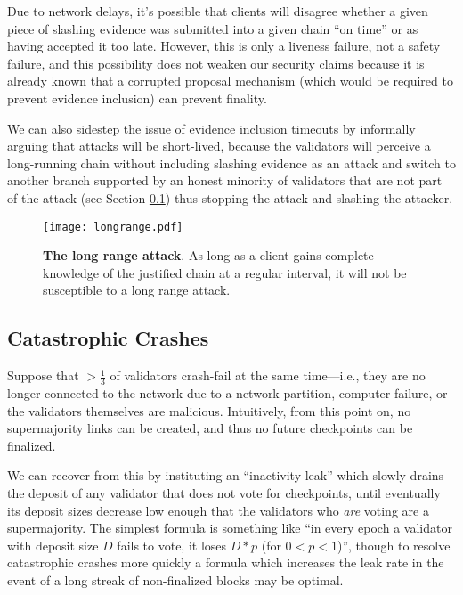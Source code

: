 \documentclass[12pt]{article}
\begin{document}
Due to network delays, it's possible that clients will disagree whether a given piece of slashing evidence was submitted into a given chain ``on time'' or as having accepted it too late. However, this is only a liveness failure, not a safety failure, and this possibility does not weaken our security claims because it is already known that a corrupted proposal mechanism (which would be required to prevent evidence inclusion) can prevent finality.

We can also sidestep the issue of evidence inclusion timeouts by informally arguing that attacks  will be short-lived, because the validators will perceive a long-running chain without including slashing evidence as an attack and switch to another branch supported by an honest minority of validators that are not part of the attack (see Section \ref{sect:leak}) thus stopping the attack and slashing the attacker.

\begin{figure}[tb]
\centering
\texttt{[image: longrange.pdf]}
\caption{\textbf{The long range attack}.  As long as a client gains complete knowledge of the justified chain at a regular interval, it will not be susceptible to a long range attack.}
\label{fig:longrange}
\end{figure}



\subsection{Catastrophic Crashes}
\label{sect:leak}

Suppose that $>\frac{1}{3}$ of validators crash-fail at the same time---i.e., they are no longer connected to the network due to a network partition, computer failure, or the validators themselves are malicious. Intuitively, from this point on, no supermajority links can be created, and thus no future checkpoints can be finalized.

We can recover from this by instituting an ``inactivity leak'' which slowly drains the deposit of any validator that does not vote for checkpoints, until eventually its deposit sizes decrease low enough that the validators who \emph{are} voting are a supermajority.  The simplest formula is something like ``in every epoch a validator with deposit size $D$ fails to vote, it loses $D * p$ (for $0 < p < 1$)'', though to resolve catastrophic crashes more quickly a formula which increases the leak rate in the event of a long streak of non-finalized blocks may be optimal.
\end{document}
